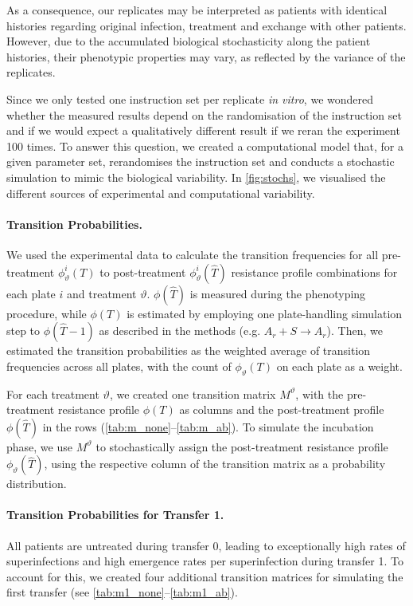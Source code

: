 As a consequence, our replicates may be interpreted as patients with identical histories regarding original infection, treatment and exchange with other patients. 
However, due to the accumulated biological stochasticity along the patient histories, their phenotypic properties may vary, as reflected by the variance of the replicates.

Since we only tested one instruction set per replicate \textit{in vitro}, we wondered whether the measured results depend on the randomisation of the instruction set and if we would expect a qualitatively different result if we reran the experiment 100 times. 
To answer this question, we created a computational model that, for a given parameter set, rerandomises the instruction set and conducts a stochastic simulation to mimic the biological variability.
In \autoref{fig:stochs}, we visualised the different sources of experimental and computational variability.


\paragraph{Transition Probabilities.}
We used the experimental data to calculate the transition frequencies for all pre-treatment $\phi^i_\vartheta(T)$ to post-treatment $\phi^i_\vartheta(\hat{T})$ resistance profile combinations for each plate $i$ and treatment $\vartheta$. 
$\phi(\hat{T})$ is measured during the phenotyping procedure, while $\phi(T)$ is estimated by employing one plate-handling simulation step to $\phi(\hat{T}-1)$ as described in the methods (e.g. $A_r  + S \rightarrow A_r$). 
Then, we estimated the transition probabilities as the weighted average of transition frequencies across all plates, with the count of $\phi_\vartheta(T)$ on each plate as a weight. 

For each treatment $\vartheta$, we created one transition matrix $M^\vartheta$, with the pre-treatment resistance profile $\phi(T)$ as columns and the post-treatment profile $\phi(\hat{T})$ in the rows (\autoref{tab:m_none}--\ref{tab:m_ab}). 
To simulate the incubation phase, we use $M^\vartheta$ to stochastically assign the post-treatment resistance profile $\phi_\vartheta(\hat{T})$, using the respective column of the transition matrix as a probability distribution.

\paragraph{Transition Probabilities for Transfer 1.}
All patients are untreated during transfer 0, leading to exceptionally high rates of superinfections and high emergence rates per superinfection during transfer 1. 
To account for this, we created four additional transition matrices for simulating the first transfer (see \autoref{tab:m1_none}--\ref{tab:m1_ab}).


